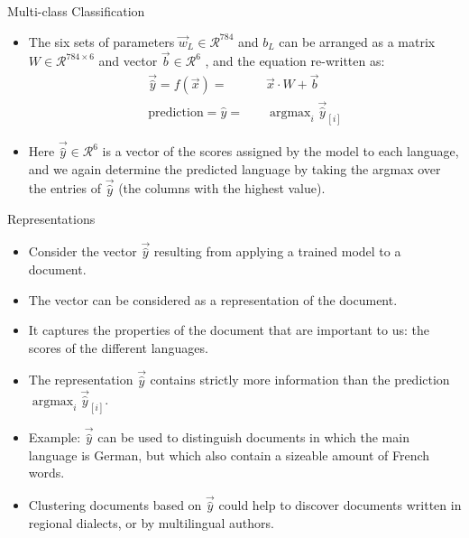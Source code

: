 \documentclass[handout]{beamer}
\begin{document}
\begin{frame}{Multi-class Classification}

\begin{scriptsize}
\begin{itemize}
\item The six sets of parameters $\vec{w}_L \in  \mathcal{R}^{784}$ and $b_L$  can be arranged as a matrix $W \in \mathcal{R}^{784\times6}$ and vector $\vec{b} \in \mathcal{R}^6$ , and the equation re-written as:
\begin{equation}
 \begin{split}
  \vec{\hat{y}} = f(\vec{x}) = \quad & \vec{x} \cdot W + \vec{b}\\
   \text{prediction} = \hat{y} = \quad  & \operatorname{argmax}_i \vec{\hat{y}}_{[i]} 
 \end{split}
\end{equation}

\item Here $\vec{\hat{y}} \in \mathcal{R}^6$ is a vector of the scores assigned by the model to each language, and we again determine the predicted language by taking the argmax over the entries of $\vec{\hat{y}}$ (the columns with the highest value).

\end{itemize}
\end{scriptsize}
\end{frame}


\begin{frame}{Representations}

\begin{scriptsize}
\begin{itemize}
\item Consider the vector $\vec{\hat{y}}$  resulting from applying a trained model to a document.
\item The vector can be considered as a representation of the document.
\item It captures the properties of the document that are important to us:  the scores of the different languages.
\item The representation $\vec{\hat{y}}$  contains strictly more information than the prediction $\operatorname{argmax}_i \vec{\hat{y}}_{[i]} $.
\item Example: $\vec{\hat{y}}$ can be used to distinguish documents in which the main language is German, but which also contain a sizeable amount of French words.
\item Clustering documents based on $\vec{\hat{y}}$ could help to discover documents written in regional dialects, or by multilingual authors.


\end{itemize}
\end{scriptsize}
\end{frame}
\end{document}
